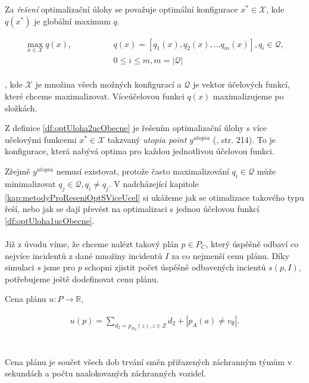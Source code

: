 \begin{definice}
  Za \textit{řešení} optimalizační úlohy se považuje optimální konfigurace $x^* \in \mathcal{X}$,
  kde $q(x^*)$ je globální maximum $q$.
  \\
\end{definice}

\begin{definice}\label{df:optUloha2ucObecne}
  \begin{align*}
    \max_{x \in \mathcal{X}} q(x), \hspace{50pt} &q(x) = [q_1(x), q_2(x), \dots q_{m}(x)], q_i \in \mathcal{Q}, \\
                                                 &0 \leq i \leq m, m = |\mathcal{Q}| 
  \end{align*}
  \\
  , kde $\mathcal{X}$ je množina všech možných konfigurací a $\mathcal{Q}$ je vektor účelových funkcí, které chceme maximalizovat.
  Víceúčelovou funkci $q(x)$ maximalizujeme po složkách.
\end{definice}

\begin{definice}
  Z definice \ref{df:optUloha2ucObecne} je řešením optimalizační úlohy s více učelovými funkcemi 
  $x^* \in \mathcal{X}$ takzvaný \textit{utopia point} $y^{utopia}$ (\citet{AlgOptBook}, str. 214).
  To je konfigurace, která nabývá optima pro každou jednotlivou účelovou funkci.
\end{definice}

Zřejmě $y^{utopia}$ nemusí existovat, protože často maximalizování $q_i \in \mathcal{Q}$ může minimalizovat $q_j \in \mathcal{Q}, q_i \neq q_j$.
V nadcházející kapitole \ref{kap:metodyProReseniOptSViceUcel} si ukážeme jak se otimalizace takového typu řeší, nebo jak se dají převést na 
optimalizaci s jednou účelovou funkcí \ref{df:optUloha1ucObecne}.
\\
\\
Již z úvodu víme, že chceme nalézt takový plán $p \in P_C$, který úspěšně odbaví co nejvíce incidentů z dané množiny incidentů $I$ za co nejmenší cenu plánu.
Díky simulaci $s$ jsme pro $p$ schopni zjistit počet úspěšně odbavených incientů $s(p, I)$, potřebujeme ještě dodefinovat cenu plánu.
\\
\begin{definice}\label{df:cenaPlanu}
  Cena plánu $u \colon P \rightarrow \mathbb{R}$,

  \begin{align*}
    u(p) = \sum_{d_2 = p_{D_2}(z), z \in Z} d_2 + |p_{A}(a) \neq v_{\emptyset}|.
  \end{align*}
  \\
  \\
  Cena plánu je součet všech dob trvání směn přiřazených záchranným týmům v sekundách a počtu naalokovaných záchranných vozidel.
  \\
\end{definice}

